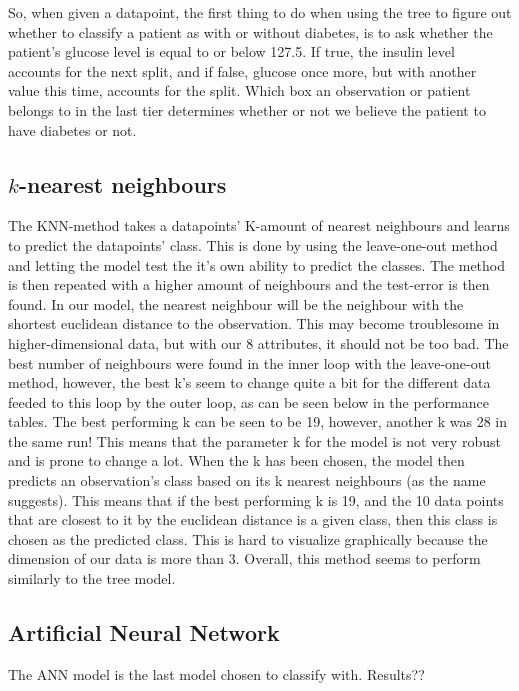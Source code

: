 So, when given a datapoint, the first thing to do when using the tree to figure
out whether to classify a patient as with or without diabetes, is to ask whether
the patient's glucose level is equal to or below 127.5. If true, the insulin level
accounts for the next split, and if false, glucose once more, but with another
value this time, accounts for the split. Which box an observation or patient belongs
to in the last tier determines whether or not we believe the patient to have diabetes
or not.

\subsection{$k$-nearest neighbours}
The KNN-method takes a datapoints' K-amount of nearest neighbours and learns to predict the datapoints' class.
This is done by using the leave-one-out method and letting the model test the it's own ability to predict the classes.
The method is then repeated with a higher amount of neighbours and the test-error is then found. In our model, the nearest
neighbour will be the neighbour with the shortest euclidean distance to the observation.
This may become troublesome in higher-dimensional data, but with our 8 attributes, it should
not be too bad. The best number of neighbours were found in the inner loop with
the leave-one-out method, however, the best k's seem to change quite a bit for the
different data feeded to this loop by the outer loop, as can be seen below in the performance
tables. The best performing k can be seen to be 19, however, another k was
28 in the same run! This means that the parameter k for the model is not very
robust and is prone to change a lot. When the k has been chosen, the model then
predicts an observation's class based on its k nearest neighbours (as the
name suggests). This means that if the best performing k is 19, and the 10
data points that are closest to it by the euclidean distance is a given class,
then this class is chosen as the predicted class. This is hard to visualize
graphically because the dimension of our data is more than 3. Overall, this
method seems to perform similarly to the tree model.

\subsection{Artificial Neural Network}
The ANN model is the last model chosen to classify with. Results??

